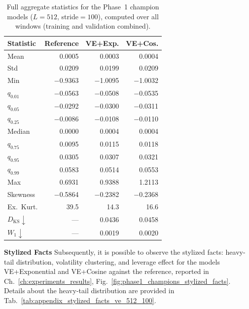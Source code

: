 \begin{table}[h]
\centering
\footnotesize
\renewcommand{\arraystretch}{1.28}
\setlength{\tabcolsep}{3pt}
\begin{tabular}{
  l
  r r r          %
}
\toprule
\textbf{Statistic}
  & \textbf{Reference} & \textbf{VE+Exp.} & \textbf{VE+Cos.} \\
\midrule
Mean
  &  0.0005 &  0.0003 &  0.0004 \\
Std
  &  0.0209 &  0.0199 &  0.0209 \\
Min
  & $-$0.9363 & $-$1.0095 & $-$1.0032 \\
$q_{0.01}$
  & $-$0.0563 & $-$0.0508 & $-$0.0535 \\
$q_{0.05}$
  & $-$0.0292 & $-$0.0300 & $-$0.0311 \\
$q_{0.25}$
  & $-$0.0086 & $-$0.0108 & $-$0.0110 \\
Median
  &  0.0000 &  0.0004 &  0.0004 \\
$q_{0.75}$
  &  0.0095 &  0.0115 &  0.0118 \\
$q_{0.95}$
  &  0.0305 &  0.0307 &  0.0321 \\
$q_{0.99}$
  &  0.0583 &  0.0514 &  0.0553 \\
Max
  &  0.6931 &  0.9388 &  1.2113 \\
Skewness
  & $-$0.5864 & $-$0.2382 & $-$0.2368 \\
Ex.\ Kurt.
  & 39.5 & 14.3 & 16.6 \\
\midrule
$D_{\mathrm{KS}}\downarrow$
  & {---} & 0.0436 & 0.0458 \\
$W_1\downarrow$
  & {---} & 0.0019 & 0.0020 \\
\bottomrule
\end{tabular}
\caption{Full aggregate statistics for the Phase~1 champion models ($L=512$, stride$=100$), computed over all windows (training and validation combined).}
\label{tab:phase1_512_100_full}
\end{table}

\textbf{Stylized Facts} \quad
Subsequently, it is possible to observe the stylized facts: heavy-tail distribution, volatility clustering, and leverage effect for the models VE+Exponential and VE+Cosine against the reference, reported in Ch.\ \ref{ch:experiments_results}, Fig.\ \ref{fig:phase1_champions_stylized_facts}. Details about the heavy-tail distribution are provided in Tab.\ \ref{tab:appendix_stylized_facts_ve_512_100}.



